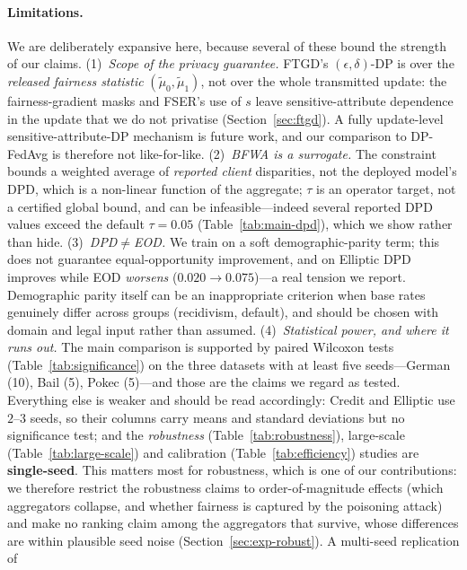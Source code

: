 \documentclass[pdflatex,sn-mathphys-num]{sn-jnl}
\theoremstyle{thmstyleone}%
\theoremstyle{thmstyletwo}%
\theoremstyle{thmstylethree}%
\begin{document}
\paragraph{Limitations.}
We are deliberately expansive here, because several of these bound the strength
of our claims. (1)~\emph{Scope of the privacy guarantee.} FTGD's
$(\epsilon,\delta)$-DP is over the \emph{released fairness statistic}
$(\tilde\mu_0,\tilde\mu_1)$, not over the whole transmitted update: the
fairness-gradient masks and FSER's use of $s$ leave sensitive-attribute
dependence in the update that we do not privatise (Section~\ref{sec:ftgd}). A
fully update-level sensitive-attribute-DP mechanism is future work, and our
comparison to DP-FedAvg is therefore not like-for-like. (2)~\emph{BFWA is a
surrogate.} The constraint bounds a weighted average of \emph{reported client}
disparities, not the deployed model's DPD, which is a non-linear function of the
aggregate; $\tau$ is an operator target, not a certified global bound, and can
be infeasible---indeed several reported DPD values exceed the default
$\tau{=}0.05$ (Table~\ref{tab:main-dpd}), which we show rather than hide.
(3)~\emph{DPD$\neq$EOD.} We train on a soft demographic-parity term; this does
not guarantee equal-opportunity improvement, and on Elliptic DPD improves while
EOD \emph{worsens} ($0.020\!\to\!0.075$)---a real tension we report. Demographic
parity itself can be an inappropriate criterion when base rates genuinely differ
across groups (recidivism, default), and should be chosen with domain and legal
input rather than assumed. (4)~\emph{Statistical power, and where it runs out.} The main comparison is
supported by paired Wilcoxon tests (Table~\ref{tab:significance}) on the three
datasets with at least five seeds---German (10), Bail (5), Pokec (5)---and those
are the claims we regard as tested. Everything else is weaker and should be read
accordingly: Credit and Elliptic use $2$--$3$ seeds, so their columns carry means
and standard deviations but no significance test; and the \emph{robustness}
(Table~\ref{tab:robustness}), large-scale (Table~\ref{tab:large-scale}) and
calibration (Table~\ref{tab:efficiency}) studies are \textbf{single-seed}. This
matters most for robustness, which is one of our contributions: we therefore
restrict the robustness claims to order-of-magnitude effects (which aggregators
collapse, and whether fairness is captured by the poisoning attack) and make no
ranking claim among the aggregators that survive, whose differences are within
plausible seed noise (Section~\ref{sec:exp-robust}). A multi-seed replication of
\end{document}

